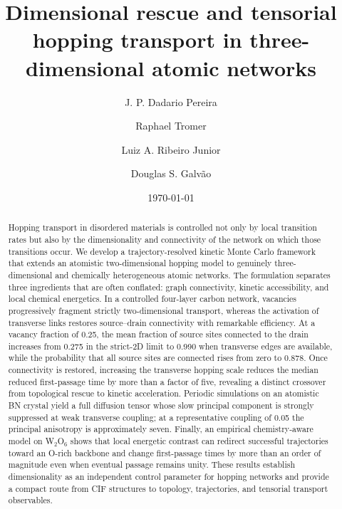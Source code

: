 \documentclass[aps,prmaterials,reprint,amsmath,amssymb,superscriptaddress,longbibliography]{revtex4-2}
\begin{document}
\title{Dimensional rescue and tensorial hopping transport in three-dimensional atomic networks}

\author{J. P. Dadario Pereira}
\author{Raphael Tromer}
\author{Luiz A. Ribeiro Junior}
\author{Douglas S. Galv\~ao}

\date{\today}

\begin{abstract}
Hopping transport in disordered materials is controlled not only by local transition rates but also by the dimensionality and connectivity of the network on which those transitions occur. We develop a trajectory-resolved kinetic Monte Carlo framework that extends an atomistic two-dimensional hopping model to genuinely three-dimensional and chemically heterogeneous atomic networks. The formulation separates three ingredients that are often conflated: graph connectivity, kinetic accessibility, and local chemical energetics. In a controlled four-layer carbon network, vacancies progressively fragment strictly two-dimensional transport, whereas the activation of transverse links restores source--drain connectivity with remarkable efficiency. At a vacancy fraction of 0.25, the mean fraction of source sites connected to the drain increases from 0.275 in the strict-2D limit to 0.990 when transverse edges are available, while the probability that all source sites are connected rises from zero to 0.878. Once connectivity is restored, increasing the transverse hopping scale reduces the median reduced first-passage time by more than a factor of five, revealing a distinct crossover from topological rescue to kinetic acceleration. Periodic simulations on an atomistic BN crystal yield a full diffusion tensor whose slow principal component is strongly suppressed at weak transverse coupling; at a representative coupling of 0.05 the principal anisotropy is approximately seven. Finally, an empirical chemistry-aware model on W$_2$O$_6$ shows that local energetic contrast can redirect successful trajectories toward an O-rich backbone and change first-passage times by more than an order of magnitude even when eventual passage remains unity. These results establish dimensionality as an independent control parameter for hopping networks and provide a compact route from CIF structures to topology, trajectories, and tensorial transport observables.
\end{abstract}
\end{document}
